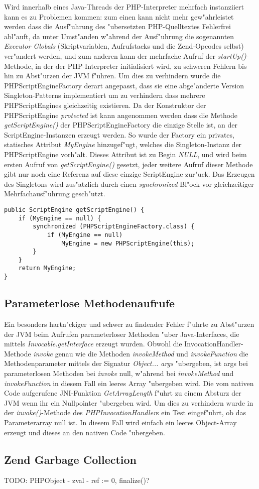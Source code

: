 Wird innerhalb eines Java-Threads der PHP-Interpreter mehrfach instanziiert kann es zu Problemen
kommen: zum einen kann nicht mehr gew"ahrleistet werden dass die Ausf"uhrung des "ubersetzten
PHP-Quelltextes Fehlerfrei abl"auft, da unter Umst"anden w"ahrend der Ausf"uhrung die sogenannten
\emph{Executor Globals} (Skriptvariablen, Aufrufstacks und die Zend-Opcodes selbst) ver"andert werden,
und zum anderen kann der mehrfache Aufruf der \emph{startUp()}-Methode, in der der PHP-Interpreter
initialisiert wird, zu schweren Fehlern bis hin zu Abst"urzen der JVM f"uhren. Um dies zu verhindern
wurde die PHPScriptEngineFactory derart angepasst, dass sie eine abge"anderte Version Singleton-Patterns
implementiert um zu verhindern dass mehrere PHPScriptEngines gleichzeitig existieren. 
Da der Konstruktor der PHPScriptEngine \emph{protected} ist kann angenommen werden dass die 
Methode \emph{getScriptEngine()} der PHPScriptEngineFactory die einzige Stelle ist, an der
ScriptEngine-Instanzen erzeugt werden. So wurde der Factory ein privates, statisches Attribut \emph{MyEngine} 
hinzugef"ugt, welches die Singleton-Instanz der PHPScriptEngine vorh"alt. Dieses Attribut ist zu Begin
\emph{NULL}, und wird beim ersten Aufruf von \emph{getScriptEngine()} gesetzt, jeder weitere Aufruf
dieser Methode gibt nur noch eine Referenz auf diese einzige ScriptEngine zur"uck. Das Erzeugen des
Singletons wird zus"atzlich durch einen \emph{synchronized}-Bl"ock vor gleichzeitiger
Mehrfachausf"uhrung gesch"utzt.
\begin{lstlisting}[caption=Singleton-Erzeugung]
public ScriptEngine getScriptEngine() {
    if (MyEngine == null) {
        synchronized (PHPScriptEngineFactory.class) {
            if (MyEngine == null)
                MyEngine = new PHPScriptEngine(this);
        }
    }
    return MyEngine;
}
\end{lstlisting}

\subsection{Parameterlose Methodenaufrufe}
\label{sec:chap2:turp:params}

Ein besonders hartn"ckiger und schwer zu findender Fehler f"uhrte zu Abst"urzen der JVM beim Aufrufen
parameterloser Methoden "uber Java-Interfaces, die mittels \emph{Invocable.getInterface} erzeugt wurden.
Obwohl die InvocationHandler-Methode \emph{invoke} genau wie die Methoden \emph{invokeMethod} und \emph{invokeFunction}
die Methodenparameter mittels der Signatur \emph{Object... args} "ubergeben, ist args bei parameterlosen Methoden
bei \emph{invoke} null, w"ahrend bei \emph{invokeMethod} und \emph{invokeFunction} in diesem Fall ein leeres Array 
"ubergeben wird. Die vom nativen Code aufgerufene JNI-Funktion \emph{GetArrayLength} f"uhrt zu einem Absturz der
JVM wenn ihr ein Nullpointer "ubergeben wird. Um dies zu verhindern wurde in der \emph{invoke()}-Methode des
\emph{PHPInvocationHandler}s ein Test eingef"uhrt, ob das Parameterarray null ist. In diesem Fall wird einfach
ein leeres Object-Array erzeugt und dieses an den nativen Code "ubergeben.

\subsection{Zend Garbage Collection}
\label{sec:chap2:turp:zendgc}

TODO: PHPObject - zval - ref := 0, finalize()?


